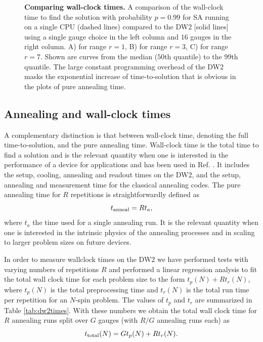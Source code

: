 \begin{figure}
\caption{{\bf Comparing wall-clock times.} A comparison of the wall-clock time to find the solution with probability $p=0.99$ for SA running on a single CPU (dashed lines) compared to the DW2 [solid lines] using a single gauge choice in the left column and $16$ gauges in the right column. A) for range $r=1$, B) for range $r=3$, C) for range $r=7$. Shown are curves from the median ($50$th quantile) to the $99$th quantile. The large constant programming overhead of the DW2 masks the exponential increase of time-to-solution that is obvious in the plots of pure annealing time.}
\label{fig:wall-clock}
\end{figure}


\subsection{Annealing and wall-clock times}
\label{sec:wall-clock-annealing-class}
A complementary distinction is that between {wall-clock time}, denoting the full time-to-solution, and the {pure annealing time}. Wall-clock time is the total time to find a solution and is the relevant quantity when one is interested in the performance of a device for applications and has been used in Ref. \cite{McGeoch}. It includes the setup, cooling, annealing and readout times on the DW2, and the setup, annealing and measurement time for the classical annealing codes.
The pure annealing time for $R$ repetitions is straightforwardly defined as
\begin{equation}
t_{\rm anneal}=Rt_a,
\end{equation}
where $t_a$ the time used for a single annealing run. It is the relevant quantity when one is interested in the intrinsic physics of the annealing processes and in scaling to larger problem sizes on future devices.

In order to measure wallclock times on the DW2 we have performed tests with varying numbers of repetitions $R$ and performed a linear regression analysis to fit the total wall clock time for each problem size to the form $t_p(N)+Rt_r(N)$, where $t_p(N)$ is the total preprocessing time and $t_r(N)$ is the total run time per repetition for an $N$-spin problem. The values of $t_p$ and $t_r$ are summarized in Table \ref{tab:dw2times}. With these numbers we obtain the total wall clock time for $R$ annealing runs split over $G$ gauges (with $R/G$ annealing runs each) as
\begin{equation}
t_{\rm total}(N)=Gt_p(N)+Rt_r(N) .\\
\label{eq:wc}
\end{equation}


